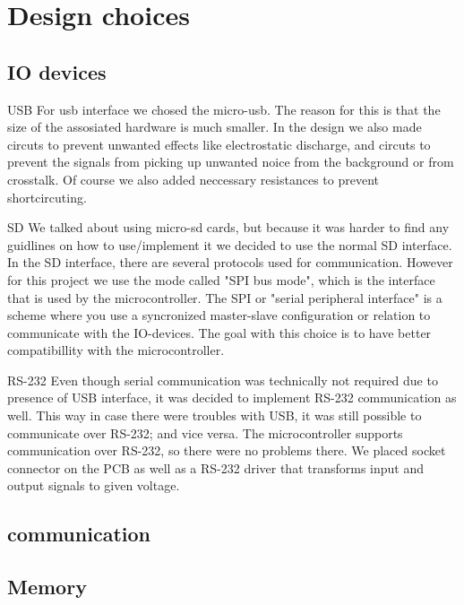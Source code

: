 \section {Design choices}

\subsection{IO devices} \label{pcb:design-choices:ss:IO_devices}
USB
For usb interface we chosed the micro-usb. 
The reason for this is that the size of the assosiated hardware is much smaller.
In the design we also made circuts to prevent unwanted effects like electrostatic discharge, and circuts to prevent the signals from picking up unwanted noice from the background or from crosstalk.
Of course we also added neccessary resistances to prevent shortcircuting.

SD
We talked about using micro-sd cards, but because it was harder to find any guidlines on how to use/implement it we decided to use the normal SD interface.
In the SD interface, there are several protocols used for communication. 
However for this project we use the mode called "SPI bus mode", which is the interface that is used by the microcontroller.  
The SPI or "serial peripheral interface" is a scheme where you use a syncronized master-slave configuration or relation to communicate with the IO-devices. 
The goal with this choice is to have better compatibillity with the microcontroller.

RS-232
Even though serial communication was technically not required due to presence of USB interface, it was decided to implement RS-232 communication as well.
This way in case there were troubles with USB, it was still possible to communicate over RS-232; and vice versa.
The microcontroller supports communication over RS-232, so there were no problems there.
We placed socket connector on the PCB as well as a RS-232 driver that transforms input and output signals to given voltage.

\subsection{communication} \label{pcb:design-choices:ss:internal_communication}

\subsection{Memory} \label{pcb:design-choices:ss:memory}

